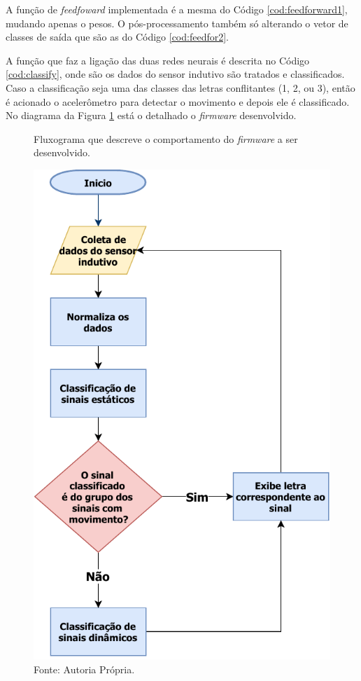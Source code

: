 A função de \textit{feedfoward} implementada é a mesma do Código \ref{cod:feedforward1}, mudando apenas o pesos. O pós-processamento também só alterando o vetor de classes de saída que são as do Código \ref{cod:feedfor2}.

A função que faz a ligação das duas redes neurais é descrita no Código \ref{cod:classify}, onde são os dados do sensor indutivo são tratados e classificados. Caso a classificação seja uma das classes das letras conflitantes (1, 2, ou 3), então é acionado o acelerômetro para detectar o movimento e depois ele é classificado. No diagrama da Figura \ref{fig:fluxograma_trabalho_todo} está o detalhado o \textit{firmware} desenvolvido.
\begin{figure}[H]
	\centering
	\caption{Fluxograma que descreve o comportamento do \textit{firmware} a ser desenvolvido.}
	\label{fig:fluxograma_trabalho_todo}
	\includegraphics[scale=0.8]{imagens/fluxograma_trabalho_todo.pdf}	
	\caption*{Fonte: Autoria Própria.}
\end{figure}